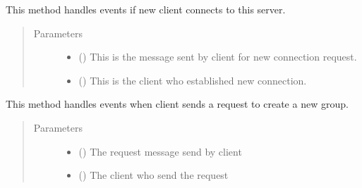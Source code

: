 \documentclass[letterpaper,10pt,english]{sphinxmanual}
\begin{document}
\begin{fulllineitems}
\label{\detokenize{serverHelper:serverHelper.newConnection}}
This method handles events if new client connects to this server.
\begin{quote}\begin{description}
\item[{Parameters}] \leavevmode\begin{itemize}
\item {} 
 () \textendash{} This is the message sent by client for new connection request.

\item {} 
 () \textendash{} This is the client who established new connection.

\end{itemize}

\end{description}\end{quote}

\end{fulllineitems}


\begin{fulllineitems}
\label{\detokenize{serverHelper:serverHelper.newGroup}}
This method handles events when client sends a request to create a new group.
\begin{quote}\begin{description}
\item[{Parameters}] \leavevmode\begin{itemize}
\item {} 
 () \textendash{} The request message send by client

\item {} 
 () \textendash{} The client who send the request

\end{itemize}

\end{description}\end{quote}

\end{fulllineitems}
\end{document}
